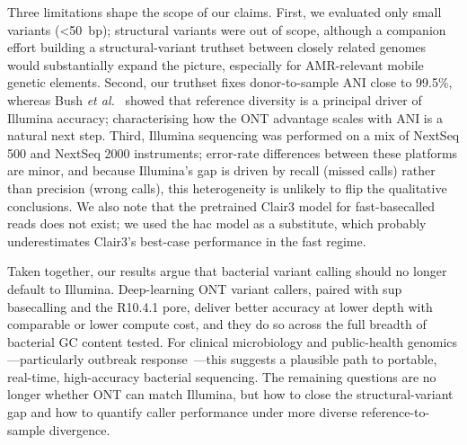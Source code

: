 \documentclass[11pt]{article}
\begin{document}
Three limitations shape the scope of our claims. First, we evaluated only small variants (\textless 50~bp); structural variants were out of scope, although a companion effort building a structural-variant truthset between closely related genomes would substantially expand the picture, especially for AMR-relevant mobile genetic elements. Second, our truthset fixes donor-to-sample ANI close to 99.5\%, whereas Bush \emph{et al.}~\citep{bush2020genomic} showed that reference diversity is a principal driver of Illumina accuracy; characterising how the ONT advantage scales with ANI is a natural next step. Third, Illumina sequencing was performed on a mix of NextSeq 500 and NextSeq 2000 instruments; error-rate differences between these platforms are minor, and because Illumina's gap is driven by recall (missed calls) rather than precision (wrong calls), this heterogeneity is unlikely to flip the qualitative conclusions. We also note that the pretrained Clair3 model for fast-basecalled reads does not exist; we used the hac model as a substitute, which probably underestimates Clair3's best-case performance in the fast regime.

Taken together, our results argue that bacterial variant calling should no longer default to Illumina. Deep-learning ONT variant callers, paired with sup basecalling and the R10.4.1 pore, deliver better accuracy at lower depth with comparable or lower compute cost, and they do so across the full breadth of bacterial GC content tested. For clinical microbiology and public-health genomics---particularly outbreak response~\citep{koser2012rapid,didelot2012transforming,quick2016realtime}---this suggests a plausible path to portable, real-time, high-accuracy bacterial sequencing. The remaining questions are no longer whether ONT can match Illumina, but how to close the structural-variant gap and how to quantify caller performance under more diverse reference-to-sample divergence.



\end{document}
